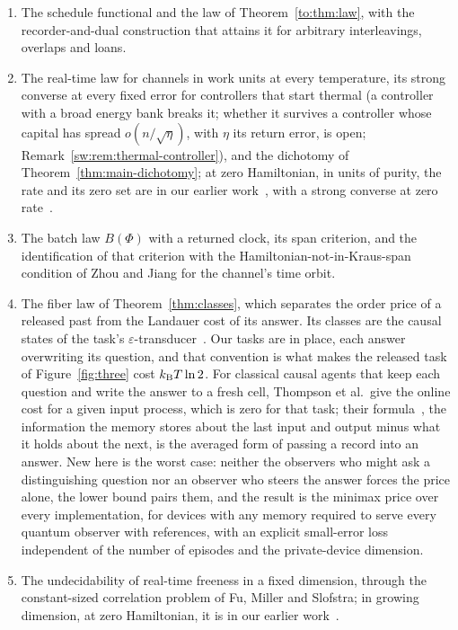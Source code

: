 \begin{enumerate}[label=(\arabic*),leftmargin=*,itemsep=1pt,topsep=2pt]
\item The schedule functional and the law of Theorem~\ref{to:thm:law}, with the recorder-and-dual construction that attains it for arbitrary interleavings, overlaps and loans.
\item The real-time law for channels in work units at every temperature, its strong converse at every fixed error for controllers that start thermal (a controller with a broad energy bank breaks it; whether it survives a controller whose capital has spread $o(n/\sqrt\eta)$, with $\eta$ its return error, is open; Remark~\ref{sw:rem:thermal-controller}), and the dichotomy of Theorem~\ref{thm:main-dichotomy}; at zero Hamiltonian, in units of purity, the rate and its zero set are in our earlier work~\cite{Memory,ImmediateDelivery,Douglas26closed}, with a strong converse at zero rate~\cite{Flagship}.
\item The batch law $B(\Phi)$ with a returned clock, its span criterion, and the identification of that criterion with the Hamiltonian-not-in-Kraus-span condition of Zhou and Jiang for the channel's time orbit.
\item The fiber law of Theorem~\ref{thm:classes}, which separates the order price of a released past from the Landauer cost of its answer. Its classes are the causal states of the task's $\varepsilon$-transducer~\cite{BarnettCrutchfield15}. Our tasks are in place, each answer overwriting its question, and that convention is what makes the released task of Figure~\ref{fig:three} cost $k_{\mathrm B} T\ln2$. For classical causal agents that keep each question and write the answer to a fresh cell, Thompson et al.\ give the online cost for a given input process, which is zero for that task; their formula~\cite[Eq.~(3)]{Thompson25}, the information the memory stores about the last input and output minus what it holds about the next, is the averaged form of passing a record into an answer. New here is the worst case: neither the observers who might ask a distinguishing question nor an observer who steers the answer forces the price alone, the lower bound pairs them, and the result is the minimax price over every implementation, for devices with any memory required to serve every quantum observer with references, with an explicit small-error loss independent of the number of episodes and the private-device dimension.
\item The undecidability of real-time freeness in a fixed dimension, through the constant-sized correlation problem of Fu, Miller and Slofstra; in growing dimension, at zero Hamiltonian, it is in our earlier work~\cite{Flagship}.

\end{enumerate}

